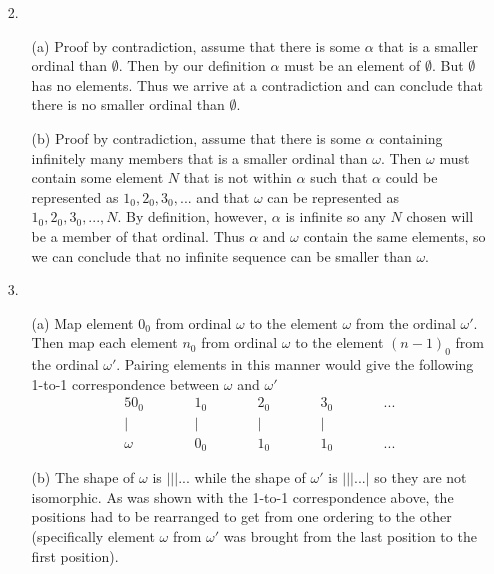 \documentclass{article}
\begin{document}
\begin{enumerate}
\item[2.]
	\begin{enumerate}
	\item[(a)]
		Proof by contradiction, assume that there is some $\alpha$ that is a smaller ordinal than $\emptyset$. Then by our definition $\alpha$ must be an element of $\emptyset$. But $\emptyset$ has no elements. Thus we arrive at a contradiction and can conclude that there is no smaller ordinal than $\emptyset$.
	\item[(b)]
		Proof by contradiction, assume that there is some $\alpha$ containing infinitely many members that is a smaller ordinal than $\omega$. Then $\omega$ must contain some element $N$ that is not within $\alpha$ such that $\alpha$ could be represented as $1_0, 2_0, 3_0, ...$ and that $\omega$ can be represented as $1_0, 2_0, 3_0, ..., N$. By definition, however, $\alpha$ is infinite so any $N$ chosen will be a member of that ordinal. Thus $\alpha$ and $\omega$ contain the same elements, so we can conclude that no infinite sequence can be smaller than $\omega$.
	\end{enumerate}

\bigskip

\item[3.]
	\begin{enumerate}
	\item[(a)]
		Map element $0_0$ from ordinal $\omega$ to the element $\omega$ from the ordinal $\omega'$. Then map each element $n_0$ from ordinal $\omega$ to the element $(n-1)_0$ from the ordinal $\omega'$. Pairing elements in this manner would give the following 1-to-1 correspondence between $\omega$ and $\omega'$\\
		
		\begin{alignat*}{5}
		    0_0  \qquad && 1_0 \qquad && 2_0  \qquad && 3_0  \qquad && ...\\
		    |  \qquad && | \qquad && |  \qquad && | \qquad && \\		    
		    \omega \qquad && 0_0 \qquad && 1_0 \qquad && 1_0  \qquad &&  ...
		\end{alignat*}
		
		\item[(b)]
			The shape of $\omega$ is $|||...$ while the shape of $\omega'$ is $|||...|$ so they are not isomorphic. As was shown with the 1-to-1 correspondence above, the positions had to be rearranged  to get from one ordering to the other (specifically element $\omega$ from $\omega'$ was brought from the last position to the first position). 
	\end{enumerate}


\end{enumerate}
\end{document}
